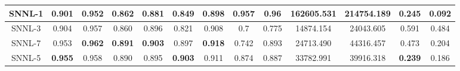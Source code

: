\documentclass[conference]{IEEEtran}
\begin{document}
\begin{table*}[htb]
\begin{tabular}{| *{13}{c|}}
         \hline
         SNNL-1 & 0.901 & 0.952 & 0.862 & 0.881 & 0.849 & 0.898 & \textbf{0.957} & \textbf{0.96} & \textbf{162605.531} & \textbf{214754.189} & 0.245 & \textbf{0.092}\\
         \hline
         SNNL-3 & 0.904 & 0.957 & 0.860 & 0.896 & 0.821 & 0.908 & 0.7 & 0.775 & 14874.154 & 24043.605 & 0.591 & 0.484\\
         \hline
         SNNL-7 & 0.953 & \textbf{0.962} & \textbf{0.891} & \textbf{0.903} & 0.897 & \textbf{0.918} & 0.742 & 0.893 & 24713.490 & 44316.457 & 0.473 & 0.204\\
         \hline
         SNNL-5 & \textbf{0.955} & 0.958 & 0.890 & 0.895 & \textbf{0.903} & 0.911 & 0.874 & 0.887 & 33782.991 & 39916.318 & \textbf{0.239} & 0.186\\
         \hline
    \end{tabular}
\end{table*}
\end{document}
